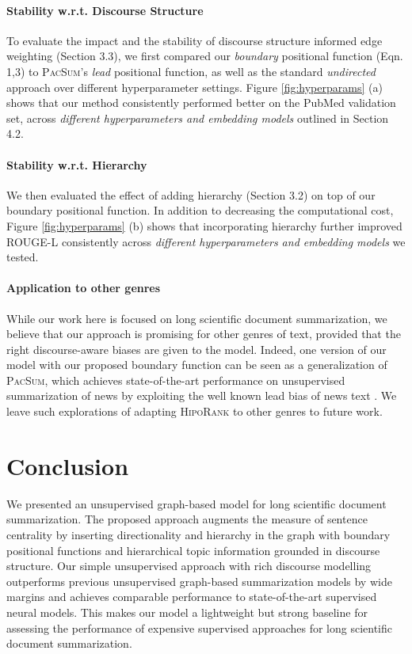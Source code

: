 \documentclass[11pt,a4paper]{article}
\begin{document}
\paragraph{Stability w.r.t. Discourse Structure}
To evaluate the impact and the stability of discourse structure informed edge weighting (Section 3.3), we first compared our \textit{boundary} positional function (Eqn. 1,3) to \textsc{PacSum}'s \textit{lead} positional function, as well as the standard \textit{undirected} approach over different hyperparameter settings.  Figure \ref{fig:hyperparams} (a) shows that our method consistently performed better on the PubMed validation set, across \textit{different hyperparameters and embedding models} outlined in Section 4.2.  

\paragraph{Stability w.r.t. Hierarchy}
We then evaluated the effect of adding hierarchy (Section 3.2) on top of our boundary positional function. In addition to decreasing the computational cost, Figure \ref{fig:hyperparams} (b) shows that incorporating hierarchy further improved ROUGE-L consistently across \textit{different hyperparameters and embedding models} we tested. 
    
\paragraph{Application to other genres}
While our work here is focused on long scientific document summarization, we believe that our approach is promising for other genres of text, provided that the right discourse-aware biases are given to the model. Indeed, one version of our model with our proposed boundary function can be seen as a generalization of \textsc{PacSum}, which achieves state-of-the-art performance on unsupervised summarization of news by exploiting the well known lead bias of news text \citep{zheng2019sentence,grenander-etal-2019-countering}. We leave such explorations of adapting \textsc{HipoRank} to other genres to future work. 




\section{Conclusion}
We presented an unsupervised graph-based model for long scientific document summarization. The proposed approach augments the measure of sentence centrality by inserting directionality and hierarchy in the graph with boundary positional functions and hierarchical topic information grounded in discourse structure.
Our simple unsupervised approach with rich discourse modelling outperforms previous unsupervised graph-based summarization models by wide margins and achieves comparable performance to state-of-the-art supervised neural models. This makes our model a lightweight but strong baseline for assessing the performance of expensive supervised approaches for long scientific document summarization.  
\end{document}
